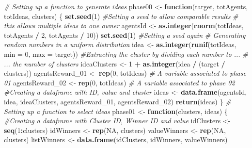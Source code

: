 \documentclass[]{elsarticle} %
\newenvironment{Shaded}{\begin{snugshade}}{\end{snugshade}}
\newcommand{\KeywordTok}[1]{\textcolor[rgb]{0.13,0.29,0.53}{\textbf{#1}}}
\newcommand{\DataTypeTok}[1]{\textcolor[rgb]{0.13,0.29,0.53}{#1}}
\newcommand{\DecValTok}[1]{\textcolor[rgb]{0.00,0.00,0.81}{#1}}
\newcommand{\StringTok}[1]{\textcolor[rgb]{0.31,0.60,0.02}{#1}}
\newcommand{\CommentTok}[1]{\textcolor[rgb]{0.56,0.35,0.01}{\textit{#1}}}
\newcommand{\OtherTok}[1]{\textcolor[rgb]{0.56,0.35,0.01}{#1}}
\newcommand{\ControlFlowTok}[1]{\textcolor[rgb]{0.13,0.29,0.53}{\textbf{#1}}}
\newcommand{\OperatorTok}[1]{\textcolor[rgb]{0.81,0.36,0.00}{\textbf{#1}}}
\newcommand{\NormalTok}[1]{#1}
\begin{document}
\begin{Shaded}
\begin{Highlighting}[]
\CommentTok{# Setting up a function to generate ideas}
\NormalTok{phase00 <-}\StringTok{ }\ControlFlowTok{function}\NormalTok{(target, totAgents, totIdeas, clusters) \{}
\KeywordTok{set.seed}\NormalTok{(}\DecValTok{1}\NormalTok{) }\CommentTok{#Setting a seed to allow comparable results }
\CommentTok{# this allows multiple ideas to one owner}
\NormalTok{agentsId <-}
\KeywordTok{as.integer}\NormalTok{(}\KeywordTok{rnorm}\NormalTok{(totIdeas, totAgents }\OperatorTok{/}\StringTok{ }\DecValTok{2}\NormalTok{, totAgents }\OperatorTok{/}\StringTok{ }\DecValTok{10}\NormalTok{)) }
\KeywordTok{set.seed}\NormalTok{(}\DecValTok{1}\NormalTok{) }\CommentTok{#Setting a seed again}
\CommentTok{# Generating random numbers in a uniform distribution}
\NormalTok{idea <-}
\KeywordTok{as.integer}\NormalTok{(}\KeywordTok{runif}\NormalTok{(totIdeas, }\DataTypeTok{min =} \DecValTok{0}\NormalTok{, }\DataTypeTok{max =}\NormalTok{ target)) }
\CommentTok{#Extracting the cluster by dividing each number to ... }
\CommentTok{# ... the number of clusters}
\NormalTok{ideaClusters <-}
\DecValTok{1} \OperatorTok{+}\StringTok{ }\KeywordTok{as.integer}\NormalTok{(idea }\OperatorTok{/}\StringTok{ }\NormalTok{(target }\OperatorTok{/}\StringTok{ }\NormalTok{clusters)) }
\NormalTok{agentsReward_}\DecValTok{01}\NormalTok{ <-}
\KeywordTok{rep}\NormalTok{(}\DecValTok{0}\NormalTok{, totIdeas) }\CommentTok{# A variable associated to phase 01}
\NormalTok{agentsReward_}\DecValTok{02}\NormalTok{ <-}
\KeywordTok{rep}\NormalTok{(}\DecValTok{0}\NormalTok{, totIdeas) }\CommentTok{# A variable associated to phase 02}
\CommentTok{#Creating a dataframe with ID, value and cluster}
\NormalTok{ideas <-}
\KeywordTok{data.frame}\NormalTok{(agentsId,}
\NormalTok{idea,}
\NormalTok{ideaClusters,}
\NormalTok{agentsReward_}\DecValTok{01}\NormalTok{,}
\NormalTok{agentsReward_}\DecValTok{02}\NormalTok{) }
\KeywordTok{return}\NormalTok{(ideas)}
\NormalTok{\}}
\CommentTok{# Setting up a function to select ideas}
\NormalTok{phase01 <-}\StringTok{ }\ControlFlowTok{function}\NormalTok{(clusters, ideas) \{}
\CommentTok{#Creating a dataframe with Cluster ID, Winner ID and value}
\NormalTok{idClusters <-}\StringTok{ }\KeywordTok{seq}\NormalTok{(}\DecValTok{1}\OperatorTok{:}\NormalTok{clusters)}
\NormalTok{idWinners <-}\StringTok{ }\KeywordTok{rep}\NormalTok{(}\OtherTok{NA}\NormalTok{, clusters)}
\NormalTok{valueWinners <-}\StringTok{ }\KeywordTok{rep}\NormalTok{(}\OtherTok{NA}\NormalTok{, clusters)}
\NormalTok{listWinners <-}\StringTok{  }\KeywordTok{data.frame}\NormalTok{(idClusters, idWinners, valueWinners)}

\end{Highlighting}
\end{Shaded}
\end{document}
